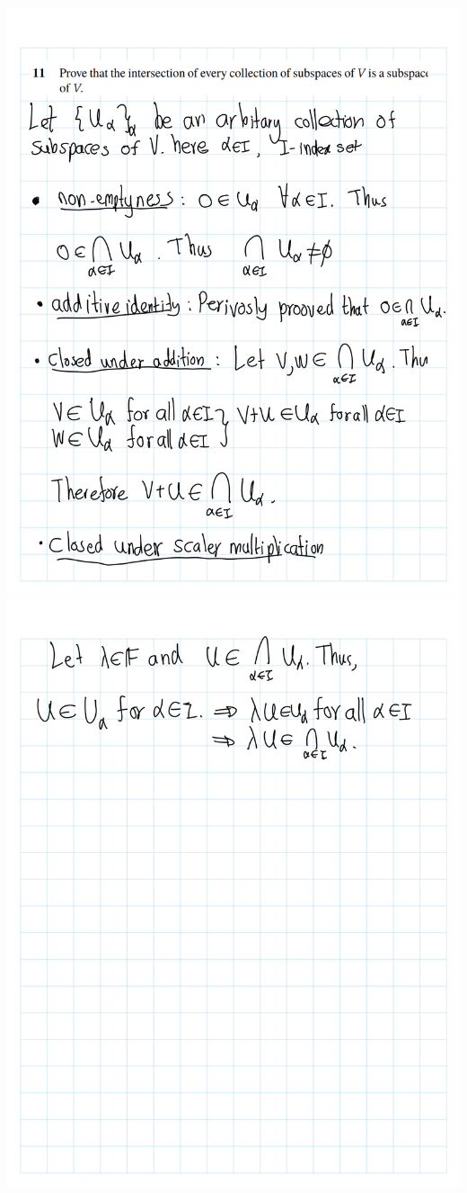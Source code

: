 \documentclass[
]{book}
\theoremstyle{definition}
\theoremstyle{definition}
\theoremstyle{definition}
\theoremstyle{definition}
\theoremstyle{remark}
\begin{document}
\begin{enumerate}
  \includegraphics{fig/Ex1C/Ex/Ex-10.png}
  \includegraphics{fig/Ex1C/Ex/Ex-11.png}

\end{enumerate}
\end{document}
